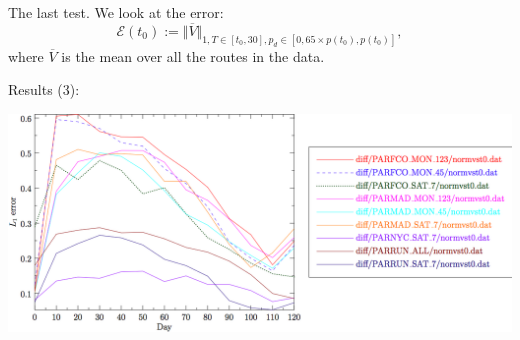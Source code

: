 \documentclass{beamer}
\begin{document}
\frame
{
The last test. We look at the error:
$$\mathcal E(t_0):= \Vert \overline V \Vert_{1, T\in [t_0,30], p_d\in [0,65\times p(t_0), p(t_0)]},$$
where $\overline  V$ is  the mean over all the routes in the data.
}

\frame
{
Results (3):
\hspace{0.4cm}
\begin{center}
\includegraphics[width=10.cm]{res6.png}
\end{center}
\vspace{-0.4cm}
}
\end{document}
